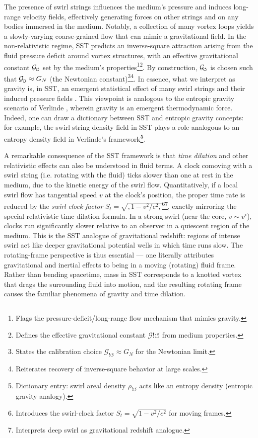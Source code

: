\documentclass[12pt]{article}
\DeclareRobustCommand{\swirlarrow}{
\mathchoice{\mkern-2mu\scriptstyle\boldsymbol{\circlearrowleft}}%
{\mkern-2mu\scriptstyle\boldsymbol{\circlearrowleft}}%
{\mkern-2mu\scriptscriptstyle\boldsymbol{\circlearrowleft}}%
{\mkern-2mu\scriptscriptstyle\boldsymbol{\circlearrowleft}}
}%
\newcommand{\Gswirl}{\mathcal{G}_{\swirlarrow}}
\begin{document}


The presence of swirl strings influences the medium’s pressure and induces long-range velocity fields, effectively generating forces on other strings and on any bodies immersed in the medium. Notably, a collection of many vortex loops yields a slowly-varying coarse-grained flow that can mimic a gravitational field. In the non-relativistic regime, SST predicts an inverse-square attraction arising from the fluid pressure deficit around vortex structures, with an effective gravitational constant $\Gswirl$ set by the medium’s properties\footnote{Flags the pressure-deficit/long-range flow mechanism that mimics gravity.}\footnote{Defines the effective gravitational constant $\mathcal G{!\circlearrowleft}$ from medium properties.}. By construction, $\Gswirl$ is chosen such that $\Gswirl\approx G_N$ (the Newtonian constant)\footnote{States the calibration choice $\mathcal G_{!\circlearrowleft}\approx G_N$ for the Newtonian limit.}\footnote{Reiterates recovery of inverse-square behavior at large scales.}. In essence, what we interpret as gravity is, in SST, an emergent statistical effect of many swirl strings and their induced pressure fields \cite{Iskandarani2025RotatingFrame}. This viewpoint is analogous to the entropic gravity scenario of Verlinde \cite{Verlinde2011,Verlinde2017}, wherein gravity is an emergent thermodynamic force. Indeed, one can draw a dictionary between SST and entropic gravity concepts: for example, the swirl string density field in SST plays a role analogous to an entropy density field in Verlinde’s framework\footnote{Dictionary entry: swirl areal density $\rho_{!\circlearrowleft}$ acts like an entropy density (entropic gravity analogy).}.


A remarkable consequence of the SST framework is that \emph{time dilation} and other relativistic effects can also be understood in fluid terms. A clock comoving with a swirl string (i.e. rotating with the fluid) ticks slower than one at rest in the medium, due to the kinetic energy of the swirl flow. Quantitatively, if a local swirl flow has tangential speed $v$ at the clock’s position, the proper time rate is reduced by the \emph{swirl clock factor} $S_t = \sqrt{,1 - v^2/c^2,}$\footnote{Introduces the swirl-clock factor $S_t=\sqrt{1-v^2/c^2}$ for moving frames.}\footnote{Interprets deep swirl as gravitational redshift analogue.}, exactly mirroring the special relativistic time dilation formula. In a strong swirl (near the core, $v \sim v^{\circ}$), clocks run significantly slower relative to an observer in a quiescent region of the medium. This is the SST analogue of gravitational redshift: regions of intense swirl act like deeper gravitational potential wells in which time runs slow. The rotating-frame perspective is thus essential --- one literally attributes gravitational and inertial effects to being in a moving (rotating) fluid frame. Rather than bending spacetime, mass in SST corresponds to a knotted vortex that drags the surrounding fluid into motion, and the resulting rotating frame causes the familiar phenomena of gravity and time dilation.
\end{document}
